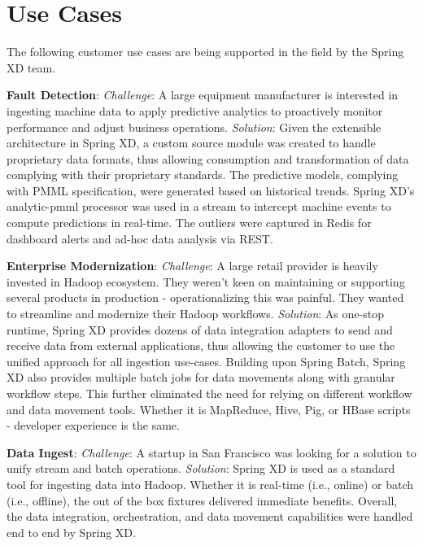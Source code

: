 \section{Use Cases}
The following customer use cases are being supported in the field by the Spring XD team.

\begin{itemize*}
\item \textbf{Fault Detection}: \textit{Challenge}: A large equipment manufacturer is  interested in ingesting machine data to apply predictive analytics to proactively monitor performance and adjust business operations. \textit{Solution}: Given the extensible architecture in Spring XD, a custom source module was created to handle proprietary data formats, thus allowing consumption and transformation of data complying with their proprietary standards. The predictive models, complying with PMML specification, were generated based on historical trends. Spring XD's analytic-pmml processor was used in a stream to intercept machine events to compute predictions in real-time. The outliers were captured in Redis for dashboard alerts and ad-hoc data analysis via REST.
\item \textbf{Enterprise Modernization}: \textit{Challenge}: A large retail provider is heavily invested in Hadoop ecosystem. They weren't keen on maintaining or supporting several products in production - operationalizing this was painful. They wanted to streamline and modernize their Hadoop workflows. \textit{Solution}: As one-stop runtime, Spring XD provides dozens of data integration adapters to send and receive data from external applications, thus allowing the customer to use the unified approach for all ingestion use-cases. Building upon Spring Batch, Spring XD also provides multiple batch jobs for data movements along with granular workflow steps. This further eliminated the need for relying on different workflow and data movement tools. Whether it is MapReduce, Hive, Pig, or HBase scripts - developer experience is the same.
\item \textbf{Data Ingest}: \textit{Challenge}: A startup in San Francisco was looking for a solution to unify stream and batch operations. \textit{Solution}: Spring XD is used as a standard tool for ingesting data into Hadoop. Whether it is real-time (i.e., online) or batch (i.e., offline), the out of the box fixtures delivered immediate benefits. Overall, the data integration, orchestration, and data movement capabilities were handled end to end by Spring XD.

\end{itemize*}
